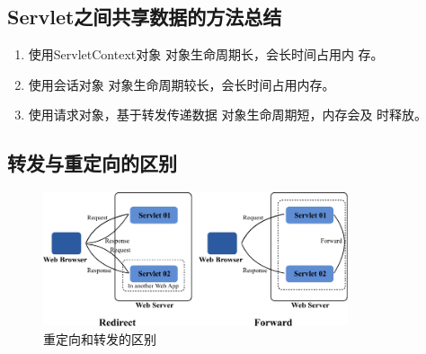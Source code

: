 
\subsection{Servlet之间共享数据的方法总结} 

\begin{enumerate}
\item {\hei 使用ServletContext对象} 对象生命周期长，会长时间占用内
  存。
\item {\hei 使用会话对象} 对象生命周期较长，会长时间占用内存。
\item {\hei 使用请求对象，基于转发传递数据} 对象生命周期短，内存会及
  时释放。
\end{enumerate}

\subsection{转发与重定向的区别} 

\begin{figure}[htb]
\centering
\includegraphics[width=0.8\textwidth]{images/JavaEE-ServletContext-and-Web-configuration/fig-redirect-and-forward.pdf}
\caption{重定向和转发的区别}
\label{fig:redirect-and-forword}
\end{figure}


